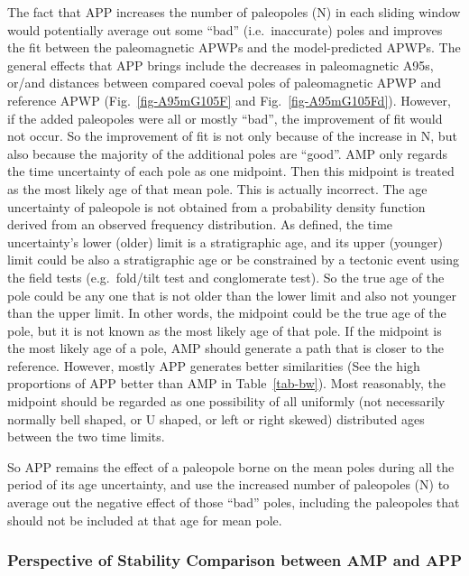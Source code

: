 The fact that APP increases the number of paleopoles (N) in each sliding window
would potentially average out some ``bad'' (i.e.\ inaccurate) poles and improves
the fit between the paleomagnetic APWPs and the model-predicted APWPs. The
general effects that APP brings include the decreases in paleomagnetic A95s,
or/and distances between compared coeval poles of paleomagnetic APWP and
reference APWP (Fig.~\ref{fig-A95mG105F} and Fig.~\ref{fig-A95mG105Fd}).
However, if the added paleopoles were all or mostly ``bad'', the improvement of
fit would not occur. So the improvement of fit is not only because of the
increase in N, but also because the majority of the additional poles are
``good''. AMP only regards the time uncertainty of each pole as one midpoint.
Then this midpoint is treated as the most likely age of that mean pole. This is
actually incorrect. The age uncertainty of paleopole is not obtained from a
probability density function derived from an observed frequency distribution. As
defined, the time uncertainty's lower (older) limit is a stratigraphic age, and
its upper (younger) limit could be also a stratigraphic age or be constrained by
a tectonic event using the field tests (e.g.\ fold/tilt test and conglomerate
test). So the true age of the pole could be any one that is not older than the
lower limit and also not younger than the upper limit. In other words, the
midpoint could be the true age of the pole, but it is not known as the most
likely age of that pole. If the midpoint is the most likely age of a pole, AMP
should generate a path that is closer to the reference. However, mostly APP
generates better similarities (See the high proportions of APP better than AMP
in Table~\ref{tab-bw}). Most reasonably, the midpoint should be regarded as
one possibility of all uniformly (not necessarily normally bell shaped, or U
shaped, or left or right skewed) distributed ages between the two time limits.

So APP remains the effect of a paleopole borne on the mean poles during all the
period of its age uncertainty, and use the increased number of paleopoles (N)
to average out the negative effect of those ``bad'' poles, including the
paleopoles that should not be included at that age for mean pole.

\subsubsection{Perspective of Stability Comparison between AMP and APP}


